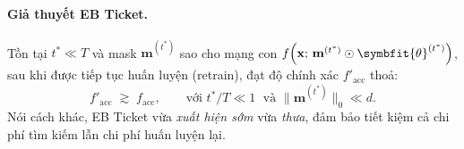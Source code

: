 \paragraph{\textbf{Giả thuyết EB Ticket.}}
Tồn tại $t^* \ll T$ và mask $\mathbf{m}^{(t^*)}$ sao cho mạng con
$f\!\left(\mathbf{x};\,\mathbf{m}^{(t^*)} \odot \symbfit{\theta}^{(t^*)}\right)$,
sau khi được tiếp tục huấn luyện (retrain), đạt độ chính xác $f'_{\mathrm{acc}}$ thoả:
\begin{equation}
    f'_{\mathrm{acc}} \;\gtrsim\; f_{\mathrm{acc}},
    \qquad \text{với } t^*/T \ll 1 \;\text{ và } \|\mathbf{m}^{(t^*)}\|_0 \ll d.
    \label{eq:eb_hypothesis}
\end{equation}
Nói cách khác, EB Ticket vừa \emph{xuất hiện sớm} vừa \emph{thưa}, đảm bảo tiết kiệm cả chi phí
tìm kiếm lẫn chi phí huấn luyện lại.

